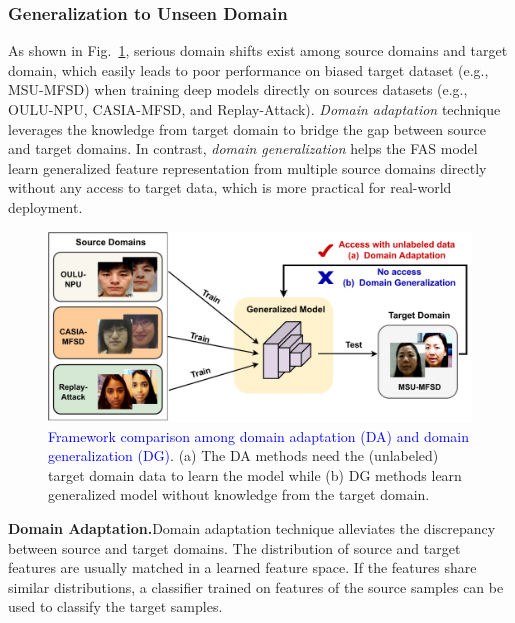 \documentclass[10pt,journal,compsoc]{IEEEtran}
\begin{document}
\subsubsection{Generalization to Unseen Domain}





As shown in Fig.~\ref{fig:domain}, serious domain shifts exist among source domains and target domain, which easily leads to poor performance on biased target dataset (e.g., MSU-MFSD) when training deep models directly on sources datasets (e.g., OULU-NPU, CASIA-MFSD, and Replay-Attack). \textit{Domain adaptation} technique leverages the knowledge from target domain to bridge the gap between source and target domains. In contrast, \textit{domain generalization} helps the FAS model learn generalized feature representation from multiple source domains directly without any access to target data, which is more practical for real-world deployment. 



\begin{figure}
\centering
\includegraphics[scale=0.4]{Figures/domain.pdf}
  \caption{ 
\textcolor{blue}{Framework comparison among domain adaptation (DA) and domain generalization (DG)}. (a) The DA methods need the (unlabeled) target domain data to learn the model while (b) DG methods learn generalized model without knowledge from the target domain.
  }
\label{fig:domain}
\end{figure}




\vspace{0.4em}
\noindent\textbf{Domain Adaptation.}\quad    Domain adaptation technique alleviates the discrepancy between source and target domains. The distribution of source and target features are usually matched in a learned feature space. If the features share similar distributions, a classifier trained on features of the source samples can be used to classify the target samples.
\end{document}
